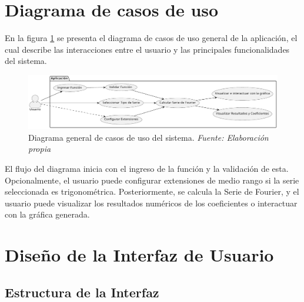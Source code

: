 \newpage

\section{Diagrama de casos de uso}
En la figura \ref{fig:Diagrama_casos_de_uso} se presenta el diagrama de casos de uso general de la aplicación, el cual describe las interacciones entre el usuario y las principales funcionalidades del sistema. 
\begin{figure}[H]
	\centering
	\includegraphics[width=1\textwidth]{img/chapter04/DCU.pdf}
	\caption[Diagrama general de casos de uso del sistema]{Diagrama general de casos de uso del sistema. \textit{Fuente: \textit{Elaboración propia}}}
	\label{fig:Diagrama_casos_de_uso}
\end{figure}
El flujo del diagrama inicia con el ingreso de la función y la validación de esta. Opcionalmente, el usuario puede configurar extensiones de medio rango si la serie seleccionada es trigonométrica. Posteriormente, se calcula la Serie de Fourier, y el usuario puede visualizar los resultados numéricos de los coeficientes o interactuar con la gráfica generada.


\section{Diseño de la Interfaz de Usuario}
\subsection{Estructura de la Interfaz}

